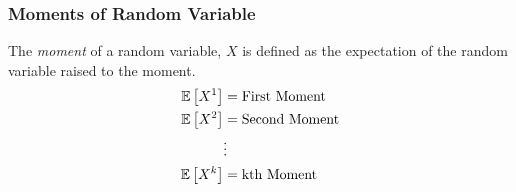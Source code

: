 		\subsubsection{Moments of Random Variable} \label{subsubsec:Moments of a Random Variable}
			\begin{definition}[Moment]
				The \emph{moment} of a random variable, $X$ is defined as the expectation of the random variable raised to the moment.
				\begin{equation} \label{eq:Moments of a Random Variable}
					\begin{aligned}
						\operatorname{\operatorname{\mathbb{E}}} \left[ X^{1} \right] &= \text{First Moment} \\
						\operatorname{\operatorname{\mathbb{E}}} \left[ X^{2} \right] &= \text{Second Moment} \\
						&\vdots \\
						\operatorname{\operatorname{\mathbb{E}}} \left[ X^{k} \right] &= \text{kth Moment} \\
					\end{aligned}
				\end{equation}
			\end{definition}					
	
